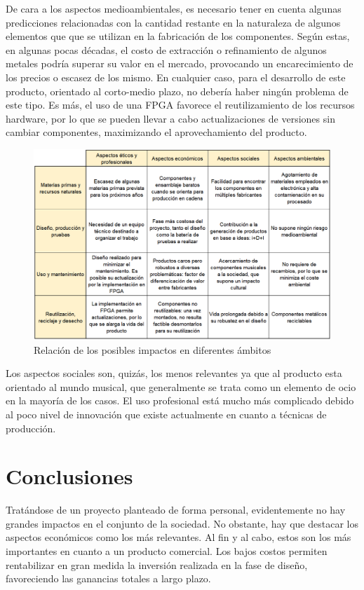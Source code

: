 De cara a los aspectos medioambientales, es necesario tener en cuenta algunas predicciones relacionadas con la cantidad restante en la naturaleza de algunos elementos que que se utilizan en la fabricación de los componentes. Según estas, en algunas pocas décadas, el costo de extracción o refinamiento de algunos metales podría superar su valor en el mercado, provocando un encarecimiento de los precios o escasez de los mismo. En cualquier caso, para el desarrollo de este producto, orientado al corto-medio plazo, no debería haber ningún problema de este tipo. Es más, el uso de una FPGA favorece el reutilizamiento de los recursos hardware, por lo que se pueden llevar a cabo actualizaciones de versiones sin cambiar componentes, maximizando el aprovechamiento del producto.
 
\begin{figure}[!th]
\begin{center}
\includegraphics[width=14cm]{img/aspectos.png}
\caption{\label{fig:aspectos}Relación de los posibles impactos en diferentes ámbitos}
\end{center}
\end{figure}

Los aspectos sociales son, quizás, los menos relevantes ya que al producto esta orientado al mundo musical, que generalmente se trata como un elemento de ocio en la mayoría de los casos. El uso profesional está mucho más complicado debido al poco nivel de innovación que existe actualmente en cuanto a técnicas de producción.

\section{Conclusiones}
Tratándose de un proyecto planteado de forma personal, evidentemente no hay grandes impactos en el conjunto de la sociedad. No obstante, hay que destacar los aspectos económicos como los más relevantes. Al fin y al cabo, estos son los más importantes en cuanto a un producto comercial. Los bajos costos permiten rentabilizar en gran medida la inversión realizada en la fase de diseño, favoreciendo las ganancias totales a largo plazo.